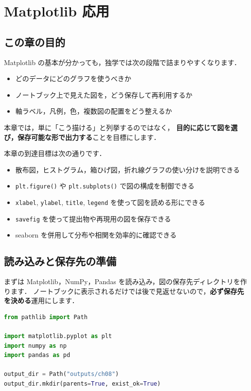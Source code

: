 
\chapter{Matplotlib 応用}


\section{この章の目的}

Matplotlib の基本が分かっても，独学では次の段階で詰まりやすくなります．
\begin{itemize}
\item どのデータにどのグラフを使うべきか
\item ノートブック上で見えた図を，どう保存して再利用するか
\item 軸ラベル，凡例，色，複数図の配置をどう整えるか
\end{itemize}

本章では，単に「こう描ける」と列挙するのではなく，
\textbf{目的に応じて図を選び，保存可能な形で出力する}ことを目標にします．

本章の到達目標は次の通りです．
\begin{itemize}
\item 散布図，ヒストグラム，箱ひげ図，折れ線グラフの使い分けを説明できる
\item \texttt{plt.figure()} や \texttt{plt.subplots()} で図の構成を制御できる
\item \texttt{xlabel}, \texttt{ylabel}, \texttt{title}, \texttt{legend} を使って図を読める形にできる
\item \texttt{savefig} を使って提出物や再現用の図を保存できる
\item seaborn を併用して分布や相関を効率的に確認できる
\end{itemize}


\section{読み込みと保存先の準備}

まずは Matplotlib，NumPy，Pandas を読み込み，図の保存先ディレクトリを作ります．
ノートブックに表示されるだけでは後で見返せないので，\textbf{必ず保存先を決める}運用にします．

\begin{lstlisting}[style=codecell,language=Python]
from pathlib import Path

import matplotlib.pyplot as plt
import numpy as np
import pandas as pd

output_dir = Path("outputs/ch08")
output_dir.mkdir(parents=True, exist_ok=True)
\end{lstlisting}

